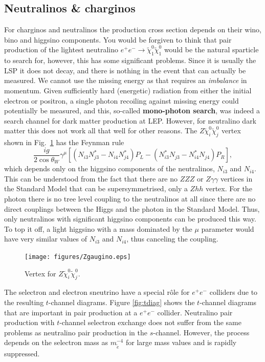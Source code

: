 \documentclass[notes.tex]{subfiles}
\begin{document}
\subsection{Neutralinos \& charginos}
For charginos and neutralinos the production cross section depends on their wino, bino and higgsino components. You would be forgiven to think that pair production of the lightest neutralino $e^+e^- \to \tilde{\chi}^0_1\tilde{\chi}^0_1$ would be the natural sparticle to search for, however, this has some significant problems. Since it is usually the LSP it does not decay, and there is nothing in the event that can actually be measured. We cannot use the missing energy as that requires an {\it imbalance} in momentum. Given sufficiently hard (energetic) radiation from either the initial electron or positron, a single photon recoiling against missing energy could potentially be measured, and this, so-called {\bf mono-photon search}, was indeed a search channel for dark matter production at LEP. However, for neutralino dark matter this does not work all that well for other reasons. The $Z\tilde\chi_i^0\tilde\chi_j^0$ vertex shown in Fig.~\ref{fig:ZNN}  has the Feynman rule 
\begin{equation}
\frac{ig}{2\cos\theta_W}\gamma^\mu\left[\left(N_{i3}N^*_{j3}-N_{i4}N^*_{j4}\right)P_L-\left(N^*_{i3}N_{j3}-N^*_{i4}N_{j4}\right)P_R\right],
\label{eq:ZNN_vertex}
\end{equation}
which depends only on the higgsino components of the neutralinos, $N_{i3}$ and $N_{i4}$. This can be understood from the fact that there are no $ZZZ$ or $Z\gamma\gamma$ vertices in the Standard Model that can be supersymmetrised, only a $Zhh$ vertex. For the photon there is no tree level coupling to the neutralinos at all since there are no direct couplings between the Higgs and the photon in the Standard Model. Thus, only neutralinos with significant higgsino components can be produced this way. To top it off, a light higgsino with a mass dominated by the $\mu$ parameter would have very similar values of $N_{i3}$ and $N_{i4}$, thus canceling the coupling.

\begin{figure}[h!]
\begin{center}
\texttt{[image: figures/Zgaugino.eps]} 
\caption{Vertex for $Z\tilde\chi_i^0\tilde\chi_j^0$.}
\label{fig:ZNN}
\end{center}
\end{figure}

The selectron and electron sneutrino have a special r\^ole for $e^+e^-$ colliders due to the resulting $t$-channel diagrams. Figure \ref{fig:tdiag} shows the $t$-channel diagrams that are important in pair production at a $e^+e^-$ collider.  
Neutralino pair production with $t$-channel selectron exchange does not suffer from the same problems as neutralino pair production in the $s$-channel. However, the process depends on the selectron mass as $m_{\tilde e}^{-4}$ for large mass values and is rapidly suppressed.
\end{document}
